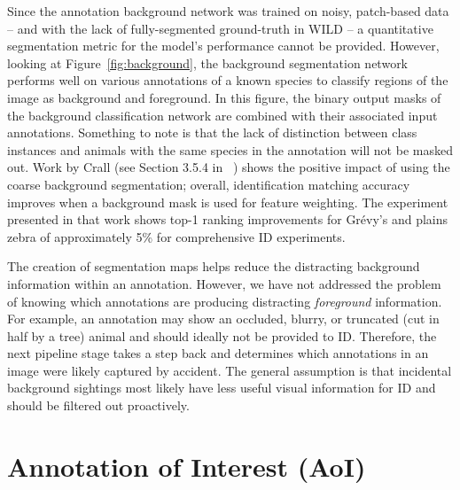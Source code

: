Since the annotation background network was trained on noisy, patch-based data -- and with the lack of fully-segmented ground-truth in WILD -- a quantitative segmentation metric for the model's performance cannot be provided.  However, looking at Figure~\ref{fig:background}, the background segmentation network performs well on various annotations of a known species to classify regions of the image as background and foreground.  In this figure, the binary output masks of the background classification network are combined with their associated input annotations.  Something to note is that the lack of distinction between class instances and animals with the same species in the annotation will not be masked out.  Work by Crall (see Section 3.5.4 in ~\cite{crall_identifying_2017}) shows the positive impact of using the coarse background segmentation; overall, identification matching accuracy improves when a background mask is used for feature weighting.  The experiment presented in that work shows top-1 ranking improvements for Gr\'evy's and plains zebra of approximately 5\% for comprehensive ID experiments.

The creation of segmentation maps helps reduce the distracting background information within an annotation. However, we have not addressed the problem of knowing which annotations are producing distracting \textit{foreground} information.  For example, an annotation may show an occluded, blurry, or truncated (cut in half by a tree) animal and should ideally not be provided to ID. Therefore, the next pipeline stage takes a step back and determines which annotations in an image were likely captured by accident.  The general assumption is that incidental background sightings most likely have less useful visual information for ID and should be filtered out proactively.

\section{Annotation of Interest (AoI)} \label{sec:aoi}

